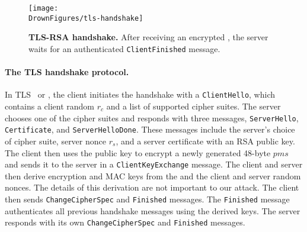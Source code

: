 %



\ifsubmit\relax\else
\begin{figure}
	\texttt{[image: \\DrownFigures/tls-handshake]} 
	\caption{\textbf{TLS-RSA handshake.} After receiving an encrypted \pms, the server waits for an authenticated \texttt{ClientFinished} message.}
	\label{fig:tls-handshake}
\end{figure}
\fi

\paragraph{The TLS handshake protocol.}
In TLS~\cite{rfc5246} or \sslthree, the client initiates the handshake with a \texttt{ClientHello}, which contains a client random $r_c$ and a list of supported cipher suites. The server chooses one of the cipher suites and responds with three messages, \texttt{ServerHello}, \texttt{Certificate}, and \texttt{ServerHelloDone}. These messages include the server's choice of cipher suite, server nonce $r_s$, and a server certificate with an RSA public key. The client then uses the public key to encrypt a newly generated 48-byte \pms $pms$ and sends it to the server in a \texttt{ClientKeyExchange} message. The client and server then derive encryption and MAC keys from the \pms and the client and server random nonces. The details of this derivation are not important to our attack.  The client then sends \texttt{ChangeCipherSpec} and \texttt{Finished} messages. The \texttt{Finished} message authenticates all previous handshake messages using the derived keys. The server responds with its own \texttt{ChangeCipherSpec} and \texttt{Finished} messages.

